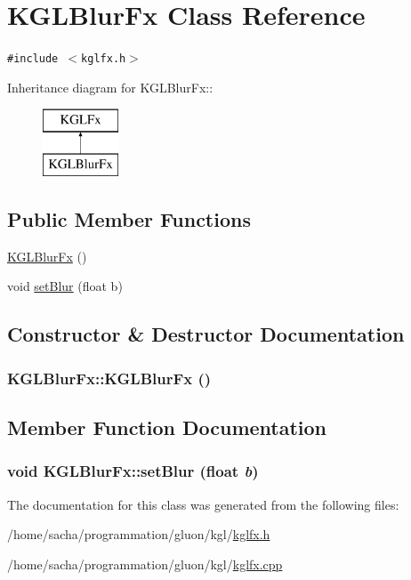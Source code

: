 \hypertarget{class_k_g_l_blur_fx}{
\section{KGLBlurFx Class Reference}
\label{class_k_g_l_blur_fx}
}
{\tt \#include $<$kglfx.h$>$}

Inheritance diagram for KGLBlurFx::\begin{figure}[H]
\begin{center}
\leavevmode
\includegraphics[height=2cm]{class_k_g_l_blur_fx}
\end{center}
\end{figure}
\subsection*{Public Member Functions}
\begin{CompactItemize}
\item 
\hyperlink{class_k_g_l_blur_fx_9d36e6a50c511834d83986055cc41cb4}{KGLBlurFx} ()
\item 
void \hyperlink{class_k_g_l_blur_fx_20e5761413ba19286c3d5484a4d37968}{setBlur} (float b)
\end{CompactItemize}


\subsection{Constructor \& Destructor Documentation}
\hypertarget{class_k_g_l_blur_fx_9d36e6a50c511834d83986055cc41cb4}{
\subsubsection[{KGLBlurFx}]{\setlength{\rightskip}{0pt plus 5cm}KGLBlurFx::KGLBlurFx ()}}
\label{class_k_g_l_blur_fx_9d36e6a50c511834d83986055cc41cb4}




\subsection{Member Function Documentation}
\hypertarget{class_k_g_l_blur_fx_20e5761413ba19286c3d5484a4d37968}{
\subsubsection[{setBlur}]{\setlength{\rightskip}{0pt plus 5cm}void KGLBlurFx::setBlur (float {\em b})}}
\label{class_k_g_l_blur_fx_20e5761413ba19286c3d5484a4d37968}




The documentation for this class was generated from the following files:\begin{CompactItemize}
\item 
/home/sacha/programmation/gluon/kgl/\hyperlink{kglfx_8h}{kglfx.h}\item 
/home/sacha/programmation/gluon/kgl/\hyperlink{kglfx_8cpp}{kglfx.cpp}\end{CompactItemize}
